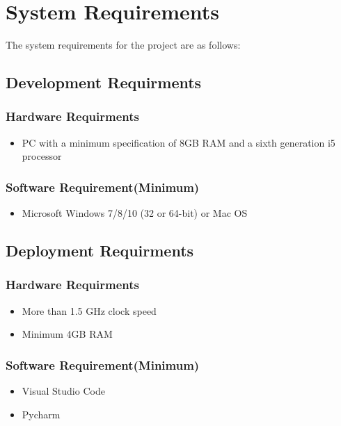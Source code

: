 \section{System Requirements}
The system requirements for the project are as follows:
\subsection{Development Requirments}

\subsubsection{Hardware Requirments}
\begin{itemize}
    \item   PC with a minimum specification of 8GB RAM and a sixth generation i5 processor 
   
    
\end{itemize}

\subsubsection{Software Requirement(Minimum)}
\begin{itemize}
    \item Microsoft Windows 7/8/10 (32 or 64-bit) or Mac OS 

    
\end{itemize}
\subsection{Deployment Requirments}

\subsubsection{Hardware Requirments}
\begin{itemize}
    \item  More than 1.5 GHz clock speed 
    \item  Minimum 4GB RAM
    
\end{itemize}

\subsubsection{Software Requirement(Minimum)}
\begin{itemize}
    \item Visual Studio Code
    \item Pycharm

    
\end{itemize}

